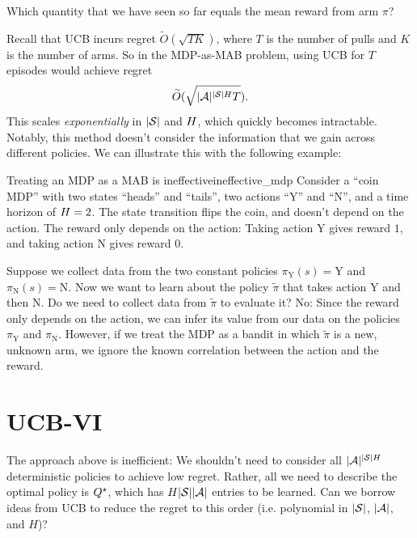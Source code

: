 \documentclass[\main/main]{subfiles}
\begin{document}
\begin{exercise}
    Which quantity that we have seen so far equals the mean reward from arm $\pi$?
\end{exercise}

Recall that UCB incurs regret $\tilde{O}(\sqrt{TK})$, where $T$ is the number of pulls and $K$ is the number of arms.
So in the MDP-as-MAB problem, using UCB for $T$ episodes would achieve regret
\begin{equation}
    \tilde{O}(\sqrt{|\A|^{|\S|\hor} T}).
    \label{eq:mdp_as_mab}
\end{equation}
This scales \emph{exponentially} in $|\S|$ and $\hor$, which quickly becomes intractable.
Notably, this method doesn't consider the information that we gain across different policies. We can illustrate this with the following example:

\begin{example}{Treating an MDP as a MAB is ineffective}{ineffective_mdp}
    Consider a ``coin MDP'' with two states ``heads'' and ``tails'', two actions ``Y'' and ``N'', and a time horizon of $\hor=2$.
    The state transition flips the coin, and doesn't depend on the action.
    The reward only depends on the action: Taking action Y gives reward $1$, and taking action N gives reward $0$.

    Suppose we collect data from the two constant policies $\pi_{\text{Y}}(s) = \text{Y}$ and $\pi_{\text{N}}(s) = \text{N}$.
    Now we want to learn about the policy $\tilde{\pi}$ that takes action Y and then N.
    Do we need to collect data from $\tilde{\pi}$ to evaluate it?
    No: Since the reward only depends on the action, we can infer its value from our data on the policies $\pi_{\text{Y}}$ and $\pi_{\text{N}}$.
    However, if we treat the MDP as a bandit in which $\tilde{\pi}$ is a new, unknown arm, we ignore the known correlation between the action and the reward.
\end{example}



\section{UCB-VI}

The approach above is inefficient: We shouldn't need to consider all $|\A|^{|\S| H}$ deterministic policies to achieve low regret.
Rather, all we need to describe the optimal policy is $\Qopt$, which has $H |\S||\A|$ entries to be learned.
Can we borrow ideas from UCB to reduce the regret to this order (i.e. polynomial in $|\S|$, $|\A|$, and $H$)?
\end{document}
